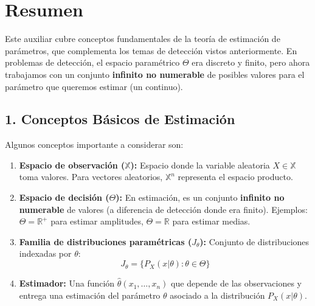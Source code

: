 \documentclass[
  11pt,
  letterpaper,
   addpoints,
   answers
  ]{exam}
\begin{document}
\newpage
\section*{Resumen}

Este auxiliar cubre conceptos fundamentales de la teoría de estimación de parámetros, que complementa los temas de detección vistos anteriormente. En problemas de detección, el espacio paramétrico $\Theta$ era discreto y finito, pero ahora trabajamos con un conjunto \textbf{infinito no numerable} de posibles valores para el parámetro que queremos estimar (un continuo).

\subsection*{1. Conceptos Básicos de Estimación}
Algunos conceptos importante a considerar son:
\begin{enumerate}
\item \textbf{Espacio de observación ($\mathbb{X}$):} Espacio donde la variable aleatoria $X \in \mathbb{X}$ toma valores. Para vectores aleatorios, $\mathbb{X}^n$ representa el espacio producto.

  \item  \textbf{Espacio de decisión ($\Theta$):} En estimación, es un conjunto \textbf{infinito no numerable} de valores (a diferencia de detección donde era finito). Ejemplos: $\Theta = \mathbb{R}^+$ para estimar amplitudes, $\Theta = \mathbb{R}$ para estimar medias.

\item \textbf{Familia de distribuciones paramétricas ($J_\theta$):} Conjunto de distribuciones indexadas por $\theta$:
\[
J_\theta = \{P_X(x|\theta) : \theta \in \Theta\}
\]

\item \textbf{Estimador:} Una función $\hat{\theta}(x_1, \ldots, x_n)$ que depende de las observaciones y entrega una estimación del parámetro $\theta$ asociado a la distribución $P_X(x|\theta)$.
\end{enumerate}
\end{document}
